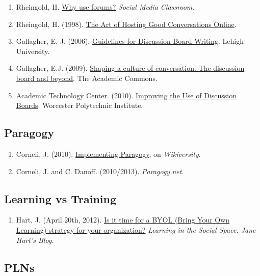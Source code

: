 \begin{enumerate}
\item
  Rheingold, H. \href{http://blip.tv/file/1123048}{Why use forums?}
  \emph{Social Media Classroom}.
\item
  Rheingold, H. (1998).
  \href{http://www.rheingold.com/texts/artonlinehost.html}{The Art of
  Hosting Good Conversations Online}.
\item
  Gallagher, E. J. (2006).
  \href{http://www.lehigh.edu/~indiscus/doc\_guidelines.html}{Guidelines
  for Discussion Board Writing}. Lehigh University.
\item
  Gallagher, E.J.
  (2009). \href{http://www.academiccommons.org/2009/01/shaping-a-culture-of-conversation-the-discussion-board-and-beyond/}{Shaping
  a culture of conversation. The discussion board and beyond}. The
  Academic Commons.
\item
  Academic Technology Center. (2010).
  \href{http://www.wpi.edu/Academics/ATC/Collaboratory/Idea/boards.html}{Improving
  the Use of Discussion Boards}. Worcester Polytechnic Institute.
\end{enumerate}

\subsection{Paragogy}

\begin{enumerate}
\item
  Corneli, J. (2010). \href{http://metameso.org/~joe/docs/paragogy-lesson.pdf}{Implementing Paragogy}, on \emph{Wikiversity}.
\item
  Corneli, J. and C. Danoff. (2010/2013). \emph{Paragogy.net}.
\end{enumerate}

\subsection{Learning vs Training}

\begin{enumerate}
\item
  Hart, J. (April 20th, 2012). \href{http://www.c4lpt.co.uk/blog/2012/04/20/is-it-time-for-a-byol-bring-your-own-learning-strategy-in-your-organization-byol/}{Is it time for a BYOL (Bring Your Own
  Learning) strategy for your organization?} \emph{Learning in the Social
  Space. Jane Hart's Blog.}
\end{enumerate}

\subsection{PLNs}


